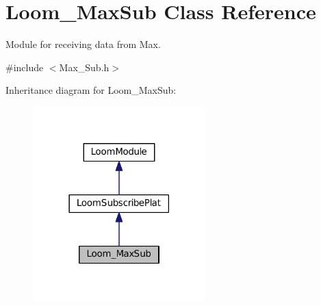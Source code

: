 \hypertarget{class_loom___max_sub}{}\section{Loom\+\_\+\+Max\+Sub Class Reference}
\label{class_loom___max_sub}


Module for receiving data from Max.  




{\ttfamily \#include $<$Max\+\_\+\+Sub.\+h$>$}



Inheritance diagram for Loom\+\_\+\+Max\+Sub\+:\nopagebreak
\begin{figure}[H]
\begin{center}
\leavevmode
\includegraphics[width=189pt]{class_loom___max_sub__inherit__graph}
\end{center}
\end{figure}
